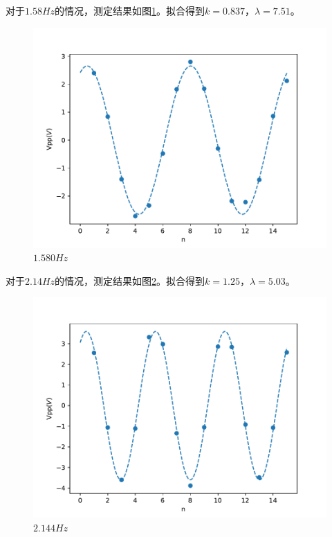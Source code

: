 \documentclass[fleqn,10pt]{SelfArx} %
\begin{document}
对于$1.58Hz$的情况，测定结果如图\ref{fig:1580}。拟合得到$k=0.837$，$\lambda=7.51$。

\begin{figure}[htbp]
	\centering
	\includegraphics[width=\linewidth]{1580.pdf}
	\caption{$1.580Hz$}
	\label{fig:1580}
\end{figure}

对于$2.14Hz$的情况，测定结果如图\ref{fig:2144}。拟合得到$k=1.25$，$\lambda=5.03$。

\begin{figure}[htbp]
	\centering
	\includegraphics[width=\linewidth]{2144.pdf}
	\caption{$2.144Hz$}
	\label{fig:2144}
\end{figure}
\end{document}
